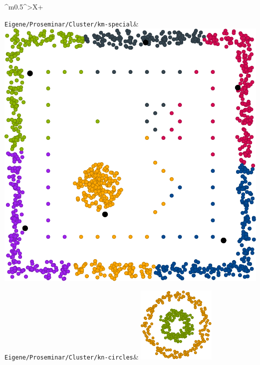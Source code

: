 \documentclass[PLAIN]{Lilly}
\begin{document}
\begin{tabularx}{\linewidth}{^m{0.5\linewidth}^>{\centering\arraybackslash}X+}
\midrule {} {}\verb|Eigene/Proseminar/Cluster/km-special|& \includegraphics[width=0.8\linewidth]{Eigene/Proseminar/Cluster/km-special.pdf}\\
\midrule {} {}\verb|Eigene/Proseminar/Cluster/kn-circles|& \includegraphics[width=0.8\linewidth]{Eigene/Proseminar/Cluster/kn-circles.pdf}\\

\end{tabularx}
\end{document}

